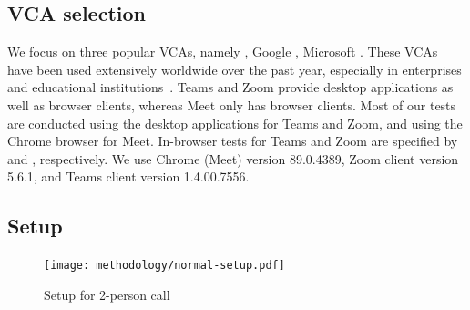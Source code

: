 







\subsection{VCA selection} 
We focus on three popular VCAs, namely \zoom, Google \meet, Microsoft \teams. These VCAs have been used extensively worldwide over the past year, especially in enterprises and educational institutions~\cite{vca_share}. %
Teams and Zoom provide desktop applications as well as browser clients, whereas Meet only has browser clients. Most of our tests are conducted using the desktop applications for Teams and Zoom, and using the Chrome browser for Meet. In-browser tests for Teams and Zoom are specified by \textit{\teamsbrowser} and \textit{\zoombrowser}, respectively. We use Chrome (Meet) version 89.0.4389, Zoom client version 5.6.1, and Teams client version 1.4.00.7556.



\subsection{Setup}
\label{subsec:setup}

\begin{figure}[t]
\centering
\texttt{[image: methodology/normal-setup.pdf]}
\caption{Setup for 2-person call}
\label{fig:static_setup}
\end{figure}


